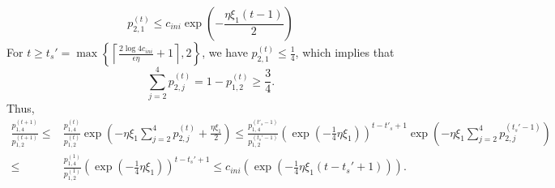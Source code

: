 \[
p_{2,1}^{(t)}\leq c_{ini}\exp\left(-\frac{\eta\xi_1(t-1)}{2}\right)
\]
For $t\geq t_s'=\max\left\{\left\lceil\frac{2\log 4c_{ini}}{\epsilon\eta}+1\right\rceil,2\right\}$, we have $p_{2,1}^{(t)}\leq \frac{1}{4}$, which implies that 
\[
\sum_{j=2}^4p_{2,j}^{(t)}= 1- p_{1,2}^{(t)}\geq\frac{3}{4}.
\] 
Thus, 
\begin{equation*}
    \begin{split}
 \frac{p^{(t+1)}_{1,4}}{p^{(t+1)}_{1,2}}\leq {} &  \frac{p^{(t)}_{1,4}}{p^{(t)}_{1,2}} \exp\left(-\eta \xi_1\sum_{j=2}^4 p^{(t)}_{2,j} + \frac{\eta\xi_1}{2}\right)\leq \frac{p^{(t'_s-1)}_{1,4}}{p^{(t_s'-1)}_{1,2}} \left(\exp\left(-\frac{1}{4}\eta \xi_1 \right)\right)^{t-t'_s+1}\exp\left(-\eta\xi_1\sum_{j=2}^4p_{2,j}^{(t_s'-1)}\right)\\
\leq {} &\frac{p^{(1)}_{1,4}}{p^{(1)}_{1,2}} \left(\exp\left(-\frac{1}{4}\eta \xi_1 \right)\right)^{t-t_s'+1}\leq c_{ini}\left(\exp\left(-\frac{1}{4}\eta \xi_1 (t-t_s'+1)\right)\right).       
    \end{split}
\end{equation*}


